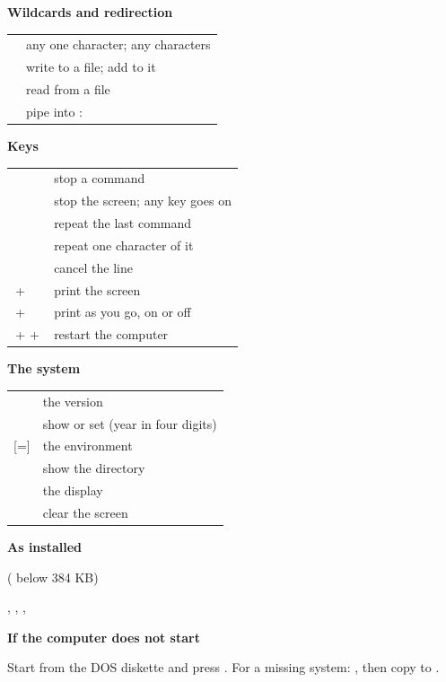 \begin{minipage}[t]{0.485\linewidth}\setlength\parskip{3pt}
\textbf{\large Wildcards and redirection}\par
\begin{tabular}{@{}P{1.2in}P{2.1in}@{}}
\quad \typed{*} & any one character; any characters\\
\typed{>} \quad \typed{>>}  & write to a file; add to it\\
\typed{<}  & read from a file\\
 \typed{|}  & pipe  into : \\
\end{tabular}

\textbf{\large Keys}\par
\begin{tabular}{@{}P{1.45in}P{1.85in}@{}}
 & stop a command\\
 & stop the screen; any key goes on\\
 & repeat the last command\\
 & repeat one character of it\\
 & cancel the line\\
\,+\, & print the screen\\
\,+\, & print as you go, on or off\\
\,+\,\,+\, & restart the computer\\
\end{tabular}

\textbf{\large The system}\par
\begin{tabular}{@{}P{1.45in}P{1.85in}@{}}
 & the version\\
\quad {} & show or set (year in four digits)\\
 [=] & the environment\\
 & show the directory\\
\quad {} & the display\\
 & clear the screen\\
\end{tabular}

\textbf{\large As installed}\par
{}\quad{}\quad( below 384 KB)\par
{}\par
{}, , , \par

\textbf{If the computer does not start}\par
Start from the DOS diskette and press . For a missing system:
, then copy  to .
\end{minipage}
